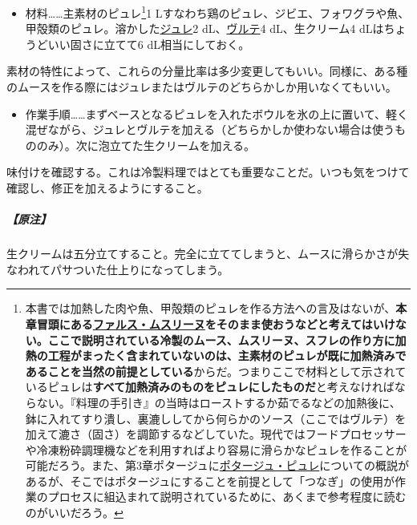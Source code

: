 \begin{recette}
\begin{itemize}
\tightlist
\item
  材料\ldots{}\ldots{}主素材のピュレ\footnote{本書では加熱した肉や魚、甲殻類のピュレを作る方法への言及はないが、\textbf{本章冒頭にある\protect\hyperlink{farce-mousseline}{ファルス・ムスリーヌ}をそのまま使おうなどと考えてはいけない。ここで説明されている冷製のムース、ムスリーヌ、スフレの作り方に加熱の工程がまったく含まれていないのは、主素材のピュレが既に加熱済みであることを当然の前提としている}からだ。つまりここで材料として示されているピュレは\textbf{すべて加熱済みのものをピュレにしたものだ}と考えなければならない。『料理の手引き』の当時はローストするか茹でるなどの加熱後に、鉢に入れてすり潰し、裏漉ししてから何らかのソース（ここではヴルテ）を加えて漉さ（固さ）を調節するなどしていた。現代ではフードプロセッサーや冷凍粉砕調理機などを利用すればより容易に滑らかなピュレを作ることが可能だろう。また、第3章ポタージュに\protect\hyperlink{les-purees}{ポタージュ・ピュレ}についての概説があるが、そこではポタージュにすることを前提として「つなぎ」の使用が作業のプロセスに組込まれて説明されているために、あくまで参考程度に読むのがいいだろう。}1
  Lすなわち鶏のピュレ、ジビエ、フォワグラや魚、甲殻類のピュレ。溶かした\protect\hyperlink{gelees-ordinaires}{ジュレ}2\undemi{}
  dL、\protect\hyperlink{veloute}{ヴルテ}4 dL、生クリーム4
  dLはちょうどいい固さに立てて6 dL相当にしておく。
\end{itemize}

素材の特性によって、これらの分量比率は多少変更してもいい。同様に、ある種のムースを作る際にはジュレまたはヴルテのどちらかしか用いなくてもいい。

\begin{itemize}
\tightlist
\item
  作業手順\ldots{}\ldots{}まずベースとなるピュレを入れたボウルを氷の上に置いて、軽く混ぜながら、ジュレとヴルテを加える（どちらかしか使わない場合は使うもののみ）。次に泡立てた生クリームを加える。
\end{itemize}

味付けを確認する。これは冷製料理ではとても重要なことだ。いつも気をつけて確認し、修正を加えるようにすること。

\hypertarget{nota-composition-de-l-appareil-pour-mousses-et-mousseline-froides}{%
\subparagraph{【原注】}\label{nota-composition-de-l-appareil-pour-mousses-et-mousseline-froides}}

生クリームは五分立てすること。完全に立ててしまうと、ムースに滑らかさが失なわれてパサついた仕上りになってしまう。

\hypertarget{moulage-des-mousses-froides}{%
}
\end{recette}
